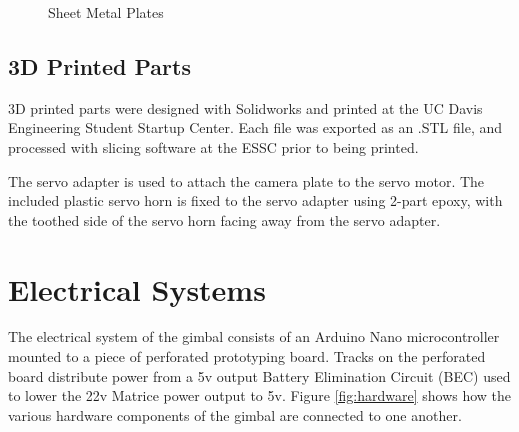 \documentclass[11pt]{article} %
\begin{document}
\begin{figure}[H]
\begin{centering}
 \qquad
{}
\caption{Sheet Metal Plates}
\end{centering}
\end{figure}


\subsection{3D Printed Parts}
3D printed parts were designed with Solidworks and printed at the UC Davis Engineering Student Startup Center. Each file was exported as an .STL file, and processed with slicing software at the ESSC prior to being printed. 

The servo adapter is used to attach the camera plate to the servo motor. The included plastic servo horn is fixed to the servo adapter using 2-part epoxy, with the toothed side of the servo horn facing away from the servo adapter. 




\newpage
\section{Electrical Systems}

The electrical system of the gimbal consists of an Arduino Nano microcontroller mounted to a piece of perforated prototyping board. Tracks on the perforated board distribute power from a 5v output Battery Elimination Circuit (BEC) used to lower the 22v Matrice power output to 5v. Figure \ref{fig:hardware} shows how the various hardware components of the gimbal are connected to one another. 
\end{document}
